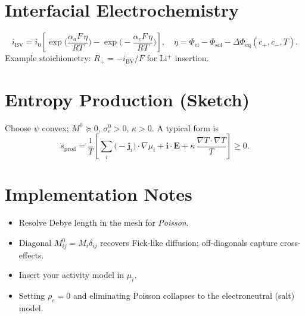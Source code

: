 \documentclass[11pt]{article}
\begin{document}
\section*{Interfacial Electrochemistry}
\[
i_{\mathrm{BV}}
= i_0 \left[
\exp\!\Big(\frac{\alpha_a F\,\eta}{RT}\Big)
- \exp\!\Big(\!-\frac{\alpha_c F\,\eta}{RT}\Big)
\right],
\quad
\eta=\Phi_{\mathrm{el}}-\Phi_{\mathrm{sol}}-\Delta\Phi_{\mathrm{eq}}(c_+,c_-,T).
\]
Example stoichiometry: $R_+=-i_{\mathrm{BV}}/F$ for Li$^+$ insertion.

\section*{Entropy Production (Sketch)}
Choose $\psi$ convex; $M^0\succeq 0$, $\sigma_e^0>0$, $\kappa>0$. A typical form is
\[
\dot{s}_{\mathrm{prod}} =
\frac{1}{T}\left[
\sum_{i} \big(-\mathbf j_i\big)\cdot\nabla\mu_i
+ \mathbf i\cdot\mathbf E
+ \kappa\,\frac{\nabla T\cdot\nabla T}{T}
\right] \ge 0.
\]

\section*{Implementation Notes}
\begin{itemize}
\item Resolve Debye length in the mesh for \emph{Poisson}.
\item Diagonal $M^0_{ij}=M_i \delta_{ij}$ recovers Fick-like diffusion; off-diagonals capture cross-effects.
\item Insert your activity model in $\mu_i$.
\item Setting $\rho_e=0$ and eliminating Poisson collapses to the electroneutral (salt) model.
\end{itemize}
\end{document}
